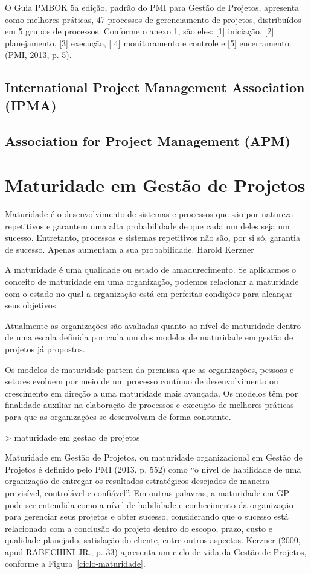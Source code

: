 O Guia PMBOK 5a edição, padrão do PMI para Gestão de Projetos, apresenta como melhores práticas, 47 processos de gerenciamento de projetos, distribuídos em 5 grupos de processos. Conforme o anexo 1, são eles: [1] iniciação, [2] planejamento, [3] execução, [ 4] monitoramento e controle e [5] encerramento. (PMI, 2013, p. 5).


  \subsection{International Project Management Association (IPMA)}

  \subsection{Association for Project Management (APM)}


\section{Maturidade em Gestão de Projetos}

Maturidade é o desenvolvimento de sistemas e processos que são por
natureza repetitivos e garantem uma alta probabilidade de que cada
um deles seja um sucesso. Entretanto, processos e sistemas repetitivos
não são, por si só, garantia de sucesso. Apenas aumentam a sua
probabilidade. Harold Kerzner

A maturidade é uma qualidade ou estado de amadurecimento. Se
aplicarmos o conceito de maturidade em uma organização, podemos relacionar a
maturidade com o estado no qual a organização está em perfeitas condições para
alcançar seus objetivos

Atualmente as organizações são avaliadas quanto ao nível de maturidade
dentro de uma escala definida por cada um dos modelos de maturidade em gestão de
projetos já propostos.

Os modelos de maturidade partem da premissa que as organizações,
pessoas e setores evoluem por meio de um processo contínuo de desenvolvimento ou
crescimento em direção a uma maturidade mais avançada. Os modelos têm por
finalidade auxiliar na elaboração de processos e execução de melhores práticas para
que as organizações se desenvolvam de forma constante.

> maturidade em gestao de projetos

Maturidade em Gestão de Projetos, ou maturidade organizacional em Gestão de Projetos é definido pelo PMI (2013, p. 552) como “o nível de habilidade de uma organização de entregar os resultados estratégicos desejados de maneira previsível, controlável e confiável”.
Em outras palavras, a maturidade em GP pode ser entendida como a nível de habilidade e conhecimento da organização para gerenciar seus projetos e obter sucesso, considerando que o sucesso está relacionado com a conclusão do projeto dentro do escopo, prazo, custo e qualidade planejado, satisfação do cliente, entre outros aspectos.
Kerzner (2000, apud RABECHINI JR., p. 33) apresenta um ciclo de vida da Gestão de Projetos, conforme a Figura~\ref{ciclo-maturidade}.

